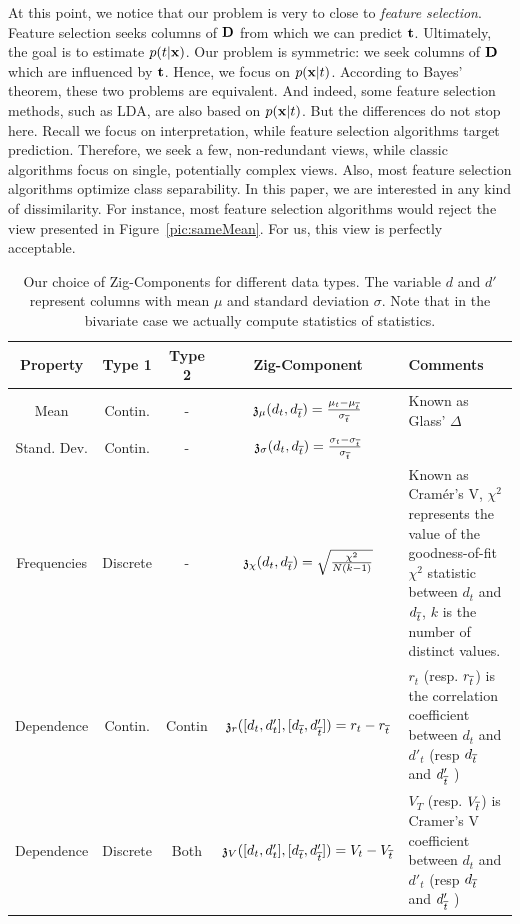 At this point, we notice that our problem is very to close to \emph{feature
selection}. Feature selection seeks columns of $\mathbf{D}$ from which we can
predict $\mathbf{t}$. Ultimately, the goal is to estimate $p(t|\mathbf{x})$. Our
problem is symmetric: we seek columns of $\mathbf{D}$ which are influenced by
$\mathbf{t}$. Hence, we focus on $p(\mathbf{x}|t)$. According to Bayes' theorem, these
two problems are equivalent. And indeed, some feature selection methods, such
as LDA, are also based on $p(\mathbf{x}|t)$. But the differences do not stop here.
Recall we focus on interpretation, while feature selection algorithms
target prediction. Therefore, we seek a few, non-redundant views, while
classic algorithms focus on single, potentially complex views. Also, most
feature selection algorithms optimize class separability. In this paper, we are
interested in any kind of dissimilarity. For instance, most feature selection
algorithms would reject the view presented in Figure~\ref{pic:sameMean}. For
us, this view is perfectly acceptable. 
\begin{table}[t]
    \centering
    \begin{tabular}{ccccp{8cm}}
      \hline
      Property & Type 1 & Type 2 & Zig-Component & Comments\\
      \hline
      Mean        & Contin.  & - &
      $  \mathfrak{z}_\mu (d_t, d_{\overline{t}}) = \frac{\mu_t - \mu_{\overline{t}}}{
      \sigma_{\overline{t}}}$&  Known as Glass' $\Delta$  \\

     Stand. Dev.& Contin.  & - &
      $ \mathfrak{z}_\sigma (d_t, d_{\overline{t}}) =  \frac{\sigma_t - \sigma_{\overline{t}}}{ \sigma_{\overline{t}}}$ & \\
    
      Frequencies & Discrete & - & 
    $  \mathfrak{z}_\chi (d_t, d_{\overline{t}}) =  \sqrt{\frac{\chi^2}{N(k - 1)}}$ & Known
          as Cram\'er's V, $\chi^2$ represents the value of the
          goodness-of-fit $\chi^2$ statistic between $d_t$ and $d_{\overline{t}}$, $k$
          is the number of distinct values.\\
      
          \hline
      Dependence  & Contin. & Contin & $
      \mathfrak{z}_r ([d_t, d'_t ], [d_{\overline{t}}, d'_{\overline{t}} ]) =     r_t - r_{\overline{t}} $ & 
      $r_t$ (resp. $r_{\overline{t}}$) is the correlation coefficient between $d_t$
      and  $d'_t$ (resp   $d_{\overline{t}}$ and  $d'_{\overline{t}}$ ) \\
      Dependence  & Discrete & Both &

      $ \mathfrak{z}_V ([d_t, d'_t ], [d_{\overline{t}}, d'_{\overline{t}} ]) = V_t - V_{\overline{t}} $ &
           $V_T$ (resp. $V_{\overline{t}}$) is Cramer's V coefficient between $d_t$
      and  $d'_t$ (resp   $d_{\overline{t}}$ and  $d'_{\overline{t}}$ ) \\ 
      \hline
    \end{tabular}
\caption{Our choice of Zig-Components for different data types. The variable
    $d$ and $d'$ represent columns with mean $\mu$ and
    standard deviation $\sigma$. Note that in the bivariate case we actually compute statistics of statistics.}
    \label{tab:dissim}
\end{table}

